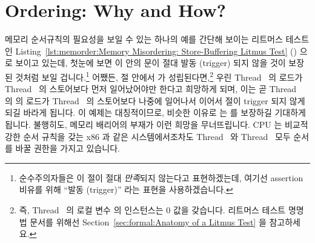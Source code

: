 \section{Ordering: Why and How?}
\label{sec:memorder:Ordering: Why and How?}

메모리 순서규칙의 필요성을 보일 수 있는 하나의 예를 간단해 보이는 리트머스
테스트인
Listing~\ref{lst:memorder:Memory Misordering: Store-Buffering Litmus Test}
() 으로 보이고 있는데, 첫눈에 보면 이 안의
 문이 절대 발동 (trigger) 되지 않을 것이 보장된 것처럼 보일
겁니다.\footnote{
	순수주의자들은 이  절이 절대 \emph{만족}되지 않는다고
	표현하겠는데, 여기선 assertion 비유를 위해 ``발동 (trigger)'' 라는
	표현을 사용하겠습니다.}
어쨌든,  절 안에서  가 성립된다면,\footnote{
	즉, Thread~ 의 로컬 변수  의 인스턴스는 0 값을
	갖습니다.
	리트머스 테스트 명명법 문서를 위해선
	Section~\ref{sec:formal:Anatomy of a Litmus Test} 을 참고하세요.}
우린 Thread~ 의  로드가 Thread~ 의  스토어보다
먼저 일어났어야만 한다고 희망하게 되며, 이는 곧 Thread~ 의  의
로드가 Thread~ 의  스토어보다 나중에 일어나서 
이어서  절이 trigger 되지 않게 되길 바라게 됩니다.
이 예제는 대칭적이므로, 비슷한 이유로  는  를
보장하길 기대하게 됩니다.
불행히도, 메모리 배리어의 부재가 이런 희망을 무너뜨립니다.
CPU 는 비교적 강한 순서 규칙을 갖는 x86 과 같은 시스템에서조차도
Thread~ 와 Thread~ 모두 순서를 바꿀 권한을 가지고 있습니다.

